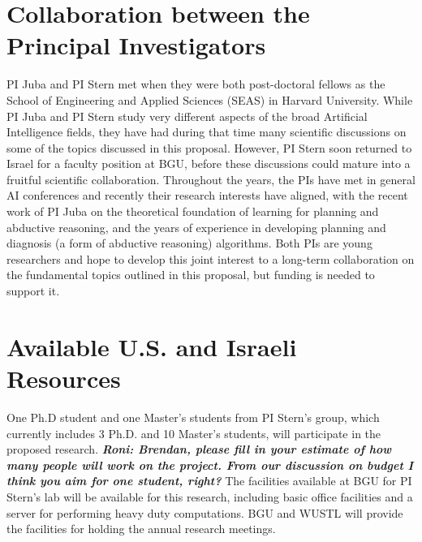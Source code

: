 \documentclass[12pt]{article}
\newcommand{\note}[1]{\textbf{\textit{#1}}}
\begin{document}

\section{Collaboration between the Principal Investigators}
PI Juba and PI Stern met when they were both post-doctoral fellows as the School of Engineering and Applied Sciences (SEAS) in Harvard University. 
While PI Juba and PI Stern study very different aspects of the broad Artificial Intelligence fields, they have had during that time many scientific discussions on some of the topics discussed in this proposal. However, PI Stern soon returned to Israel for a faculty position at BGU, before these discussions could mature into a fruitful scientific collaboration. 
Throughout the years, the PIs have met in general AI conferences
and recently their research interests have aligned, 
with the recent work of PI Juba on the theoretical foundation of learning for planning and abductive reasoning, and the years of experience in developing planning and diagnosis (a form of abductive reasoning) algorithms. 
Both PIs are young researchers and hope to develop this joint interest to a long-term collaboration on the fundamental topics outlined in this proposal, but funding is needed to support it.  

\section{Available U.S. and Israeli Resources}
One Ph.D student and one Master’s students from PI Stern’s group, which currently includes 3 Ph.D. and 10 Master's students, will participate in the proposed research. 
\note{Roni: Brendan, please fill in your estimate of how many people will work on the project. From our discussion on budget I think you aim for one student, right?}
The facilities available at BGU for PI Stern’s
lab will be available for this research, including basic office facilities and a server for performing heavy duty computations. BGU and WUSTL will provide the facilities for holding the annual research meetings.




\pagebreak


\end{document}
